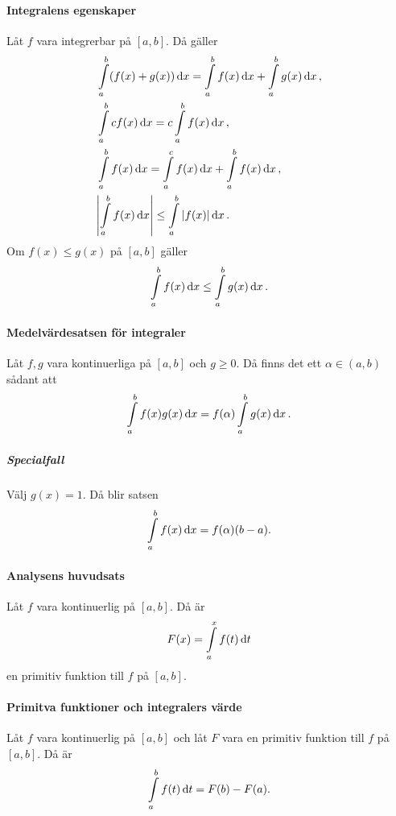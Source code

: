 \paragraph{Integralens egenskaper}
Låt $f$ vara integrerbar på $[a, b]$. Då gäller
\begin{align*}
	&\int\limits_{a}^{b}(f(x) + g(x))\dd{x} = \int\limits_{a}^{b}f(x)\dd{x} + \int\limits_{a}^{b}g(x)\dd{x}, \\
	&\int\limits_{a}^{b}cf(x)\dd{x} = c\int\limits_{a}^{b}f(x)\dd{x}, \\
	&\int\limits_{a}^{b}f(x)\dd{x} = \int\limits_{a}^{c}f(x)\dd{x} + \int\limits_{a}^{b}f(x)\dd{x}, \\
	&\abs{\int\limits_{a}^{b}f(x)\dd{x}}\leq \int\limits_{a}^{b}\abs{f(x)}\dd{x}.
\end{align*}
Om $f(x)\leq g(x)$ på $[a, b]$ gäller
\begin{align*}
	\int\limits_{a}^{b}f(x)\dd{x}\leq \int\limits_{a}^{b}g(x)\dd{x}.
\end{align*}

\proof

\paragraph{Medelvärdesatsen för integraler}
Låt $f, g$ vara kontinuerliga på $[a, b]$ och $g\geq 0$. Då finns det ett $\alpha\in (a, b)$ sådant att
\begin{align*}
	\int\limits_{a}^{b}f(x)g(x)\dd{x} = f(\alpha)\int\limits_{a}^{b}g(x)\dd{x}.
\end{align*}

\subparagraph{Specialfall}
Välj $g(x) = 1$. Då blir satsen
\begin{align*}
	\int\limits_{a}^{b}f(x)\dd{x} = f(\alpha)(b - a).
\end{align*}

\proof

\paragraph{Analysens huvudsats}
Låt $f$ vara kontinuerlig på $[a, b]$. Då är
\begin{align*}
	F(x) = \int\limits_{a}^{x}f(t)\dd{t}
\end{align*}
en primitiv funktion till $f$ på $[a, b]$.

\proof

\paragraph{Primitva funktioner och integralers värde}
Låt $f$ vara kontinuerlig på $[a, b]$ och låt $F$ vara en primitiv funktion till $f$ på $[a, b]$. Då är
\begin{align*}
	\int\limits_{a}^{b}f(t)\dd{t} = F(b) - F(a).
\end{align*}

\proof